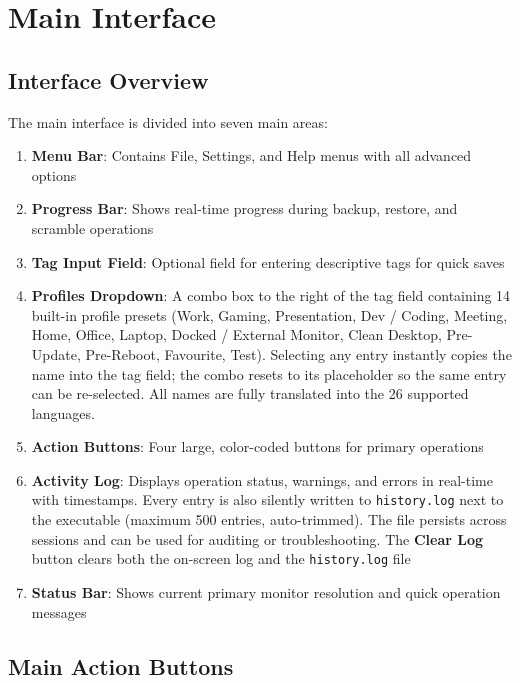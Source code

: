 \documentclass[a4paper,11pt]{article}
\begin{document}
\section{Main Interface}

\subsection{Interface Overview}

The main interface is divided into seven main areas:

\begin{enumerate}
  \item \textbf{Menu Bar}: Contains File, Settings, and Help menus
    with all advanced options
  \item \textbf{Progress Bar}: Shows real-time progress during
    backup, restore, and scramble operations
  \item \textbf{Tag Input Field}: Optional field for entering
    descriptive tags for quick saves
  \item \textbf{Profiles Dropdown}: A combo box to the right of
    the tag field containing 14 built-in profile presets (Work, Gaming,
      Presentation, Dev / Coding, Meeting, Home, Office, Laptop, Docked /
      External Monitor, Clean Desktop, Pre-Update, Pre-Reboot, Favourite,
    Test). Selecting any entry instantly copies the name into the tag
    field; the combo resets to its placeholder so the same entry can be
    re-selected. All names are fully translated into the 26 supported
    languages.
  \item \textbf{Action Buttons}: Four large, color-coded buttons for
    primary operations
  \item \textbf{Activity Log}: Displays operation status, warnings,
    and errors in real-time with timestamps. Every entry is also
    silently written to \texttt{history.log} next to the executable
    (maximum 500 entries, auto-trimmed). The file persists across
    sessions and can be used for auditing or troubleshooting.
    The \textbf{Clear Log} button clears both the on-screen log
    and the \texttt{history.log} file
  \item \textbf{Status Bar}: Shows current primary monitor resolution
    and quick operation messages
\end{enumerate}

\subsection{Main Action Buttons}
\end{document}
